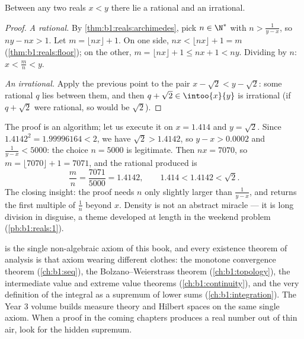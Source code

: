 \begin{theorem}\label{thm:b1:reals:density}
Between any two reals $x < y$ there lie a rational and an
irrational.
\end{theorem}

\begin{proof}
\emph{A rational.} By \cref{thm:b1:reals:archimedes}, pick $n \in
\N^*$ with $n > \frac{1}{y - x}$, so $ny - nx > 1$. Let $m = \lfloor
nx \rfloor + 1$. On one side, $nx < \lfloor nx \rfloor + 1 = m$
(\cref{thm:b1:reals:floor}); on the other, $m = \lfloor nx \rfloor +
1 \leq nx + 1 < ny$. Dividing by $n$: $x < \frac mn < y$.

\emph{An irrational.} Apply the previous point to the pair $x -
\sqrt 2 < y - \sqrt 2$: some rational $q$ lies between them, and then
$q + \sqrt 2 \in \intoo{x}{y}$ is irrational (if $q + \sqrt 2$ were
rational, so would be $\sqrt 2$).
\end{proof}

\begin{example}\label{ex:b1:reals:densityrun}
The proof is an algorithm; let us execute it on $x = 1.414$ and
$y = \sqrt 2$. Since $1.4142^2 = 1.99996164 < 2$, we have $\sqrt 2
> 1.4142$, so $y - x > 0.0002$ and $\frac{1}{y - x} < 5000$: the
choice $n = 5000$ is legitimate. Then $nx = 7070$, so $m = \lfloor
7070 \rfloor + 1 = 7071$, and the rational produced is
\[
\frac{m}{n} = \frac{7071}{5000} = 1.4142,
\qquad
1.414 < 1.4142 < \sqrt 2 .
\]
The closing insight: the proof needs $n$ only slightly larger than
$\frac{1}{y-x}$, and returns the first multiple of $\frac 1n$
beyond $x$. Density is not an abstract miracle --- it is long
division in disguise, a theme developed at length in the weekend
problem (\cref{pb:b1:reals:1}).
\end{example}

\begin{remark}
 is the single non-algebraic axiom of this
book, and every existence theorem of analysis is that axiom
wearing different clothes: the monotone convergence theorem
(\cref{ch:b1:seq}), the Bolzano--Weierstrass theorem
(\cref{ch:b1:topology}), the intermediate value and extreme value
theorems (\cref{ch:b1:continuity}), and the very definition of the
integral as a supremum of lower sums (\cref{ch:b1:integration}).
The Year 3 volume builds measure theory and Hilbert spaces on the
same single axiom. When a proof in the coming chapters produces a
real number out of thin air, look for the hidden supremum.
\end{remark}

